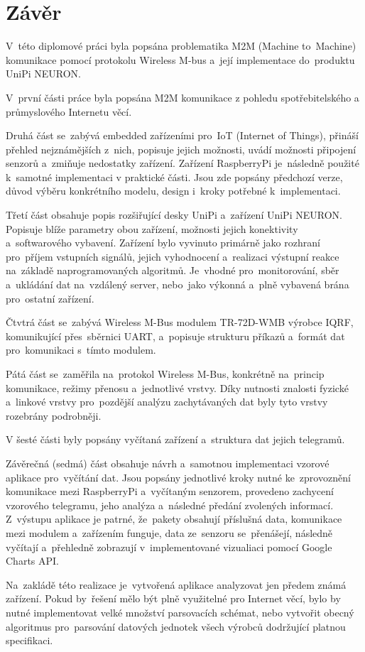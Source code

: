 \chapter{Závěr}

V~této diplomové práci byla popsána problematika M2M (Machine to~Machine) komunikace pomocí protokolu Wireless M-bus a~její implementace do~produktu UniPi NEURON.


V~první části práce byla popsána M2M komunikace z pohledu spotřebitelského a průmyslového Internetu věcí.

Druhá část se~zabývá embedded zařízeními pro~IoT (Internet of Things), přináší přehled nejznámějších z~nich, popisuje jejich možnosti, uvádí možnosti připojení senzorů a~zmiňuje nedostatky zařízení. Zařízení RaspberryPi je~následně použité k~samotné implementaci v praktické části. Jsou zde popsány předchozí verze, důvod výběru konkrétního modelu, design i~kroky potřebné k~implementaci.

Třetí část obsahuje popis rozšiřující desky UniPi a~zařízení UniPi NEURON. Popisuje blíže parametry obou zařízení, možnosti jejich konektivity a~softwarového vybavení. Zařízení bylo vyvinuto primárně jako rozhraní pro~příjem vstupních signálů, jejich vyhodnocení a~realizaci výstupní reakce na~základě naprogramovaných algoritmů. Je~vhodné pro~monitorování, sběr a~ukládání dat na~vzdálený server, nebo~jako výkonná a~plně vybavená brána pro~ostatní zařízení.

Čtvtrá část se~zabývá Wireless M-Bus modulem TR-72D-WMB výrobce IQRF, komunikující přes~sběrnici UART, a~popisuje strukturu příkazů a~formát dat pro~komunikaci s~tímto modulem.

Pátá část se~zaměřila na~protokol Wireless M-Bus, konkrétně na~princip komunikace, režimy přenosu a~jednotlivé vrstvy. 
Díky nutnosti znalosti fyzické a~linkové vrstvy pro~pozdější analýzu zachytávaných dat byly tyto vrstvy rozebrány podrobněji. 

V šesté části byly popsány vyčítaná zařízení a~struktura dat jejich telegramů.

Závěrečná (sedmá) část obsahuje návrh a~samotnou implementaci vzorové aplikace pro~vyčítání dat. Jsou popsány jednotlivé kroky nutné ke~zprovoznění komunikace mezi RaspberryPi a~vyčítaným senzorem, provedeno zachycení vzorového telegramu, jeho analýza a~následné předání zvolených informací. Z~výstupu aplikace je patrné, že~pakety obsahují příslušná data, komunikace mezi modulem a~zařízením funguje, data ze~senzoru se~přenášejí, následně vyčítají a~přehledně zobrazují v~implementované vizualiaci pomocí Google Charts API.

Na~zakládě této realizace je~vytvořená aplikace analyzovat jen předem známá zařízení. Pokud by~řešení mělo být plně využitelné pro Internet věcí, bylo by nutné implementovat velké množství parsovacích schémat, nebo vytvořit obecný algoritmus pro~parsování datových jednotek všech výrobců dodržující platnou specifikaci.



